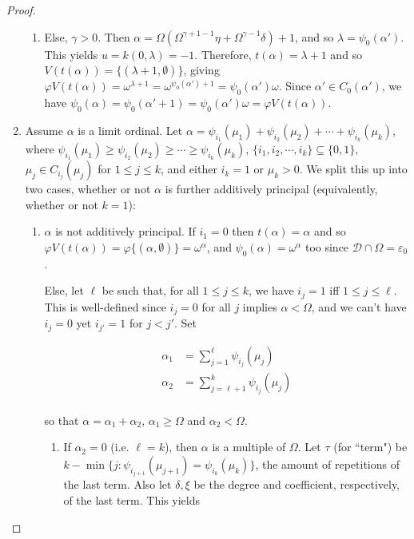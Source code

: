 \documentclass{article}
\theoremstyle{definition}
\theoremstyle{plain}
\theoremstyle{plain}
\theoremstyle{plain}
\theoremstyle{plain}
\theoremstyle{remark}
\theoremstyle{remark}
\theoremstyle{remark}
\theoremstyle{plain}
\theoremstyle{plain}
\begin{document}
\begin{proof}
\begin{enumerate}
\begin{enumerate}
        \item Else, $\gamma > 0$. Then $\alpha = \Omega (\Omega^{\gamma+1-1} \eta + \Omega^{\gamma-1} \delta)+1$, and so $\lambda = \psi_0(\alpha')$. This yields $u = k(0,\lambda) = -1$. Therefore, $t(\alpha) = \lambda+1$ and so $V(t(\alpha)) = \{(\lambda+1, \emptyset)\}$, giving $\varphi V(t(\alpha)) = \omega^{\lambda+1} = \omega^{\psi_0(\alpha')+1} = \psi_0(\alpha') \omega$. Since $\alpha' \in C_0(\alpha')$, we have $\psi_0(\alpha) = \psi_0(\alpha'+1) = \psi_0(\alpha') \omega = \varphi V(t(\alpha))$.
    \end{enumerate}
    \item Assume $\alpha$ is a limit ordinal. Let $\alpha = \psi_{i_1}(\mu_1) + \psi_{i_2}(\mu_2) + \cdots + \psi_{i_k}(\mu_k)$, where $\psi_{i_1}(\mu_1) \geq \psi_{i_2}(\mu_2) \geq \cdots \geq \psi_{i_k}(\mu_k)$, $\{i_1, i_2, \cdots, i_k\} \subseteq \{0,1\}$, $\mu_j \in C_{i_j}(\mu_j)$ for $1 \leq j \leq k$, and either $i_k = 1$ or $\mu_k > 0$. We split this up into two cases, whether or not $\alpha$ is further additively principal (equivalently, whether or not $k = 1$):
    \begin{enumerate}
        \item $\alpha$ is not additively principal. If $i_1 = 0$ then $t(\alpha) = \alpha$ and so $\varphi V(t(\alpha)) = \varphi \{(\alpha,\emptyset)\} = \omega^\alpha$, and $\psi_0(\alpha) = \omega^\alpha$ too since $\mathcal{D} \cap \Omega = \varepsilon_0$.

        Else, let $\ell$ be such that, for all $1 \leq j \leq k$, we have $i_j = 1$ iff $1 \leq j \leq \ell$. This is well-defined since $i_j = 0$ for all $j$ implies $\alpha < \Omega$, and we can't have $i_j = 0$ yet $i_{j'} = 1$ for $j < j'$. Set

        \begin{equation}
        \begin{split}
        \alpha_1 & = \sum_{j = 1}^\ell \psi_{i_j}(\mu_j) \\
        \alpha_2 & = \sum_{j = \ell+1}^k \psi_{i_j}(\mu_j) \\
        \end{split}
        \end{equation}

        so that $\alpha = \alpha_1 + \alpha_2$, $\alpha_1 \geq \Omega$ and $\alpha_2 < \Omega$.

        \begin{enumerate}
            \item If $\alpha_2 = 0$ (i.e. $\ell = k$), then $\alpha$ is a multiple of $\Omega$. Let $\tau$ (for ``term") be $k - \min\{j: \psi_{i_{j+1}}(\mu_{j+1}) = \psi_{i_k}(\mu_k)\}$, the amount of repetitions of the last term. Also let $\delta, \xi$ be the degree and coefficient, respectively, of the last term. This yields


\end{enumerate}
\end{enumerate}
\end{enumerate}
\end{proof}
\end{document}

